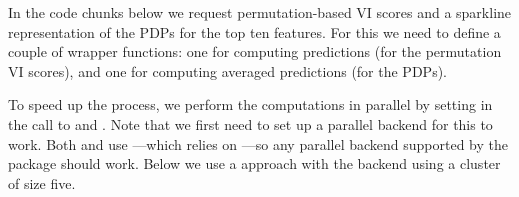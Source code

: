 In the code chunks below we request permutation-based VI scores and a
sparkline representation of the PDPs for the top ten features. For this
we need to define a couple of wrapper functions: one for computing
predictions (for the permutation VI scores), and one for computing
averaged predictions (for the PDPs).

\begin{Schunk}
\end{Schunk}

To speed up the process, we perform the computations in parallel by
setting  in the call to  and
. Note that we first need to set up a parallel
backend for this to work. Both  and  use
 \citep{R-plyr}---which relies on ---so any
parallel backend supported by the  package should work.
Below we use a  approach with the 
backend \citep{R-doParallel} using a cluster of size five.

